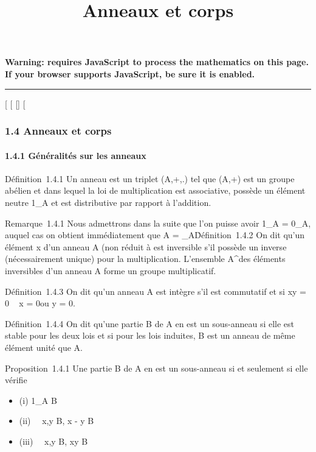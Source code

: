 \documentclass[]{article}
\title{Anneaux et corps}
\author{}
\date{}
\begin{document}
\maketitle

\textbf{Warning: 
requires JavaScript to process the mathematics on this page.\\ If your
browser supports JavaScript, be sure it is enabled.}

\begin{center}\rule{3in}{0.4pt}\end{center}

{[}
{[}
{[}{]}
{[}

\subsubsection{1.4 Anneaux et corps}

\paragraph{1.4.1 Généralités sur les anneaux}

Définition~1.4.1 Un anneau est un triplet (A,+,.) tel que (A,+) est un
groupe abélien et dans lequel la loi de multiplication est associative,
possède un élément neutre 1_A et est distributive par rapport à
l'addition.

Remarque~1.4.1 Nous admettrons dans la suite que l'on puisse avoir
1_A = 0_A, auquel cas on obtient immédiatement que A =
\0_A\.

Définition~1.4.2 On dit qu'un élément x d'un anneau A (non réduit à
\0\) est inversible s'il possède un
inverse (nécessairement unique) pour la multiplication. L'ensemble
A^\times des éléments inversibles d'un anneau A forme un groupe
multiplicatif.

Définition~1.4.3 On dit qu'un anneau A est intègre s'il est commutatif
et si xy = 0 \rigtharrow~ x = 0\text ou y = 0.

Définition~1.4.4 On dit qu'une partie B de A en est un sous-anneau si
elle est stable pour les deux lois et si pour les lois induites, B est
un anneau de même élément unité que A.

Proposition~1.4.1 Une partie B de A en est un sous-anneau si et
seulement si elle vérifie

\begin{itemize}
\itemsep1pt\parskip0pt
\item
  (i) 1_A \in B
\item
  (ii) \forall~~x,y \in B, x - y \in B
\item
  (iii) \forall~~x,y \in B, xy \in B
\end{itemize}
\end{document}
